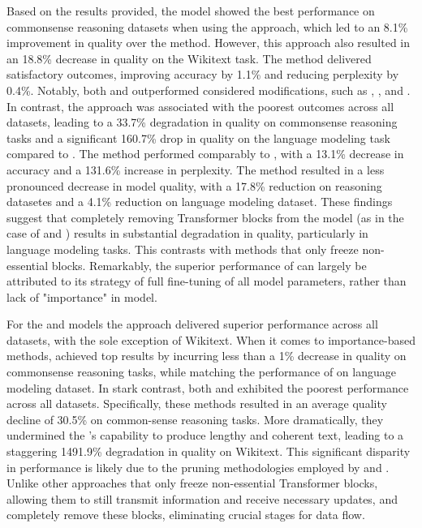 Based on the results provided, the \gpt{} model showed the best performance on commonsense reasoning datasets when using the \lisa{} approach, which led to an 8.1\% improvement in quality over the \lora{} method. However, this approach also resulted in an 18.8\% decrease in quality on the Wikitext task. The \uidl{} method delivered satisfactory outcomes, improving accuracy by 1.1\% and reducing perplexity by 0.4\%. Notably, both \lisa{} and \uidl{} outperformed considered \lora{} modifications, such as \dora{}, \pissa{}, and \adalora{}. In contrast, the \sleb{} approach was associated with the poorest outcomes across all datasets, leading to a 33.7\% degradation in quality on commonsense reasoning tasks and a significant 160.7\% drop in quality on the language modeling task compared to \lora{}. The \shortllama{} method performed comparably to \sleb{}, with a 13.1\% decrease in accuracy and a 131.6\% increase in perplexity. The \ows{} method resulted in a less pronounced decrease in model quality, with a 17.8\% reduction on reasoning datasetes and a 4.1\% reduction on language modeling dataset. These findings suggest that completely removing Transformer blocks from the model (as in the case of \sleb{} and \shortllama{}) results in substantial degradation in quality, particularly in language modeling tasks. This contrasts with methods that only freeze non-essential blocks. Remarkably, the superior performance of \lisa{} can largely be attributed to its strategy of full fine-tuning of all model parameters, rather than lack of "importance" in \gpt{} model.

For the \llamaTwoSmall{} and \llamaTwoBig{} models the \pissa{} approach delivered superior performance across all datasets, with the sole exception of Wikitext. When it comes to importance-based methods, \uidl{} achieved top results by incurring less than a 1\% decrease in quality on commonsense reasoning tasks, while matching the performance of \lora{} on language modeling dataset. In stark contrast, both \sleb{} and \shortllama{} exhibited the poorest performance across all datasets. Specifically, these methods resulted in an average quality decline of 30.5\% on common-sense reasoning tasks. More dramatically, they undermined the \llm{}'s capability to produce lengthy and coherent text, leading to a staggering 1491.9\% degradation in quality on Wikitext. This significant disparity in performance is likely due to the pruning methodologies employed by \sleb{} and \shortllama{}. Unlike other approaches that only freeze non-essential Transformer blocks, allowing them to still transmit information and receive necessary updates, \sleb{} and \shortllama{} completely remove these blocks, eliminating crucial stages for data flow.

